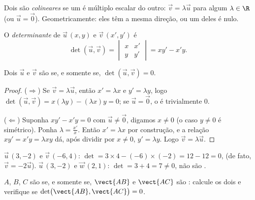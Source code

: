 \begin{definition}\label{def:g11:vect:collinear}
Dois  são \emph{colineares} se um é
múltiplo escalar do outro: $\vec v = \lambda \vec u$ para algum
$\lambda \in \R$ (ou $\vec u = \vec 0$). Geometricamente: eles têm a
mesma direção, ou um deles é nulo.
\end{definition}

\begin{definition}[Determinante]\label{def:g11:vect:det}
O \emph{determinante} de $\vec u\,(x, y)$ e
$\vec v\,(x', y')$ é
\[
\det(\vec u, \vec v) =
\begin{vmatrix} x & x' \\ y & y' \end{vmatrix}
= x y' - x' y .
\]
\end{definition}

\begin{theorem}\label{thm:g11:vect:collinearity}
Dois  $\vec u$ e $\vec v$ são  se, e somente se,
$\det(\vec u, \vec v) = 0$.
\end{theorem}

\begin{proof}
($\Rightarrow$) Se $\vec v = \lambda\vec u$, então $x' = \lambda x$ e
$y' = \lambda y$, logo
$\det(\vec u, \vec v) = x(\lambda y) - (\lambda x)y = 0$; se
$\vec u = \vec 0$, o  é trivialmente $0$.

($\Leftarrow$) Suponha $xy' - x'y = 0$ com $\vec u \neq \vec 0$, digamos
$x \neq 0$ (o caso $y \neq 0$ é simétrico). Ponha
$\lambda = \frac{x'}{x}$. Então $x' = \lambda x$ por construção, e a
relação $xy' = x'y = \lambda x y$ dá, após dividir por $x \neq 0$,
$y' = \lambda y$. Logo $\vec v = \lambda \vec u$.
\end{proof}

\begin{example}\label{ex:g11:vect:collinear}
$\vec u\,(3, -2)$ e $\vec v\,(-6, 4)$:
$\det = 3 \times 4 - (-6) \times (-2) = 12 - 12 = 0$,  (de
fato, $\vec v = -2\vec u$). $\vec u\,(3, -2)$ e $\vec w\,(2, 1)$:
$\det = 3 + 4 = 7 \neq 0$, não são .
\end{example}

\begin{method}\label{met:g11:vect:alignment}
$A$, $B$, $C$ são  se, e somente se, $\vect{AB}$ e $\vect{AC}$
são : calcule os dois  e verifique se
$\det\bigl(\vect{AB}, \vect{AC}\bigr) = 0$.
\end{method}


